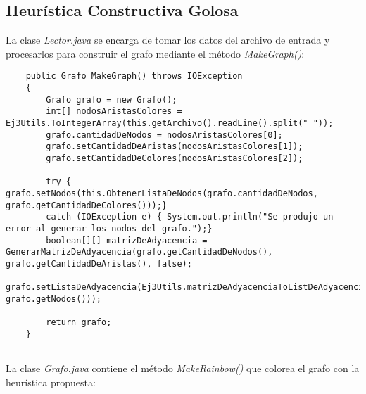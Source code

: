 \subsection{Heurística Constructiva Golosa}

La clase \emph{Lector.java} se encarga de tomar los datos del archivo de entrada y procesarlos para construir el grafo mediante el método \textit{MakeGraph()}:\\

\begin{lstlisting}
	public Grafo MakeGraph() throws IOException 
	{
		Grafo grafo = new Grafo();
		int[] nodosAristasColores = Ej3Utils.ToIntegerArray(this.getArchivo().readLine().split(" "));
		grafo.cantidadDeNodos = nodosAristasColores[0];
		grafo.setCantidadDeAristas(nodosAristasColores[1]);
		grafo.setCantidadDeColores(nodosAristasColores[2]);
		
		try { grafo.setNodos(this.ObtenerListaDeNodos(grafo.cantidadDeNodos, grafo.getCantidadDeColores()));} 
		catch (IOException e) { System.out.println("Se produjo un error al generar los nodos del grafo.");}
		boolean[][] matrizDeAdyacencia = GenerarMatrizDeAdyacencia(grafo.getCantidadDeNodos(), grafo.getCantidadDeAristas(), false);
		grafo.setListaDeAdyacencia(Ej3Utils.matrizDeAdyacenciaToListDeAdyacencia(matrizDeAdyacencia, grafo.getNodos()));
		
		return grafo;
	}
		
\end{lstlisting}


La clase \emph{Grafo.java} contiene el método \textit{MakeRainbow()} que colorea el grafo con la heurística \newline propuesta: \\

